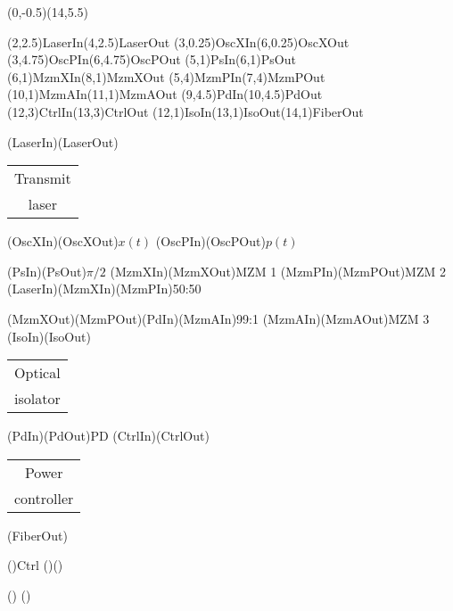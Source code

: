 \documentclass[pstricks]{standalone}
\begin{document}
	\begin{pspicture}(0,-0.5)(14,5.5)
		\begin{optexp}
			
		  	\pnodes(2,2.5){LaserIn}(4,2.5){LaserOut}
		  	\pnodes(3,0.25){OscXIn}(6,0.25){OscXOut}
		  	\pnodes(3,4.75){OscPIn}(6,4.75){OscPOut}
		  	\pnodes(5,1){PsIn}(6,1){PsOut}
		  	\pnodes(6,1){MzmXIn}(8,1){MzmXOut}
		  	\pnodes(5,4){MzmPIn}(7,4){MzmPOut}
		  	\pnodes(10,1){MzmAIn}(11,1){MzmAOut}
		  	\pnodes(9,4.5){PdIn}(10,4.5){PdOut}
		  	\pnodes(12,3){CtrlIn}(13,3){CtrlOut}
		  	\pnodes(12,1){IsoIn}(13,1){IsoOut}(14,1){FiberOut}
		  	
			\optbox[compname=Laser, position=start, optboxsize=2 1.2, labeloffset=0](LaserIn)(LaserOut){{\begin{tabular}{@{}c@{}}Transmit\\laser\end{tabular}}}
			\elecsynthesizer[compname=OscX, wire=none, labelangle=-90](OscXIn)(OscXOut){$x(t)$}
			\elecsynthesizer[compname=OscP, wire=none, labelangle=-90](OscPIn)(OscPOut){$p(t)$}
			
			\optbox[compname=Ps, optboxsize=1 0.8, labeloffset=0](PsIn)(PsOut){$\pi/2$}
			\optmzm[compname=MzmX, extnode=b, labelangle=180](MzmXIn)(MzmXOut){MZM 1}
			\optmzm[compname=MzmP, extnode=t](MzmPIn)(MzmPOut){MZM 2}
			\wdmsplitter[compname=Splitter, labeloffset=0.5](LaserIn)(MzmXIn)(MzmPIn){50:50}
			
			\optcoupler[compname=Coupler, labeloffset=0.5](MzmXOut)(MzmPOut)(PdIn)(MzmAIn){99:1}
			\optmzm[compname=MzmA, extnode=t](MzmAIn)(MzmAOut){MZM 3}
			\optisolator[compname=Iso](IsoIn)(IsoOut){\begin{tabular}{@{}c@{}}Optical\\isolator\end{tabular}}
			\optdetector[compname=Pd, extnode=r, dettype=diode, labelangle=180](PdIn)(PdOut){PD}
			\optbox[compname=Ctrl, extnode=b, optboxsize=1.8 1.2, labeloffset=0](CtrlIn)(CtrlOut){\begin{tabular}{@{}c@{}}Power\\controller\end{tabular}}
	
			(FiberOut)

			\drawwire(){Ctrl}
			\drawwire[wireangleA=65, wireangleB=65]()()

			()
			()
		\end{optexp}
	\end{pspicture}
\end{document}
